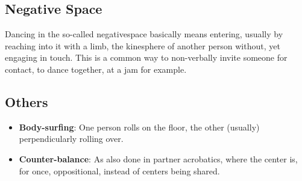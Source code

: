 \subsection{Negative Space}\label{subsec:negative-space}

Dancing in the so-called \gls{negativespace} basically means entering, usually by reaching into it with a limb, the \gls{kinesphere} of another person without, yet engaging in touch.
This is a common way to non-verbally invite someone for contact, to dance together, at a jam for example.

\subsection{Others}\label{subsec:others}

\begin{itemize}
    \item \textbf{Body-surfing}: One person rolls on the floor, the other (usually) perpendicularly rolling over.
    \item \textbf{Counter-balance}: As also done in partner acrobatics, where the center is, for once, oppositional, instead of centers being shared.
\end{itemize}